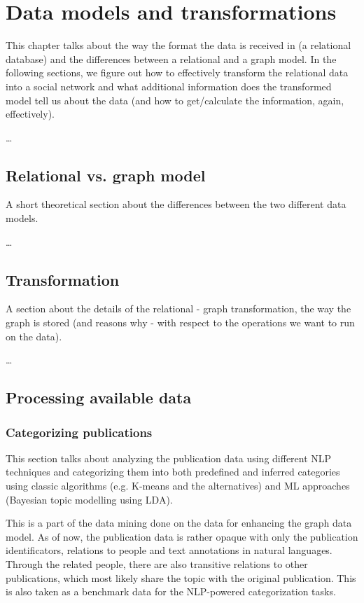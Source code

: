 \chapter{Data models and transformations}

This chapter talks about the way the format the data is received in (a relational database) and the differences between a relational and a graph model. In the following sections, we figure out how to effectively transform the relational data into a social network and what additional information does the transformed model tell us about the data (and how to get/calculate the information, again, effectively).  

\dots

\section{Relational vs. graph model}

A short theoretical section about the differences between the two different data models.

\dots

\section{Transformation}

A section about the details of the relational - graph transformation, the way the graph is stored (and reasons why - with respect to the operations we want to run on the data).

\dots

\section{Processing available data}

\subsection{Categorizing publications}

This section talks about analyzing the publication data using different NLP techniques and categorizing them into both predefined and inferred categories using classic algorithms (e.g. K-means and the alternatives) and ML approaches (Bayesian topic modelling using LDA).

This is a part of the data mining done on the data for enhancing the graph data model. As of now, the publication data is rather opaque with only the publication identificators, relations to people and text annotations in natural languages. Through the related people, there are also transitive relations to other publications, which most likely share the topic with the original publication. This is also taken as a benchmark data for the NLP-powered categorization tasks.

